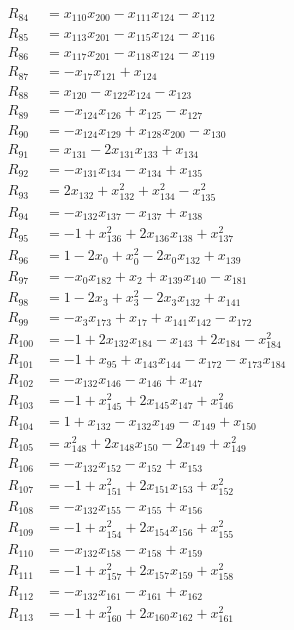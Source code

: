 \begin{align*}
R_{84}&=x_{110}x_{200}-x_{111}x_{124}-x_{112}\\
R_{85}&=x_{113}x_{201}-x_{115}x_{124}-x_{116}\\
R_{86}&=x_{117}x_{201}-x_{118}x_{124}-x_{119}\\
R_{87}&=-x_{17}x_{121}+x_{124}\\
R_{88}&=x_{120}-x_{122}x_{124}-x_{123}\\
R_{89}&=-x_{124}x_{126}+x_{125}-x_{127}\\
R_{90}&=-x_{124}x_{129}+x_{128}x_{200}-x_{130}\\
R_{91}&=x_{131}-2x_{131}x_{133}+x_{134}\\
R_{92}&=-x_{131}x_{134}-x_{134}+x_{135}\\
R_{93}&=2x_{132}+x_{132}^{2}+x_{134}^{2}-x_{135}^{2}\\
R_{94}&=-x_{132}x_{137}-x_{137}+x_{138}\\
R_{95}&=-1+x_{136}^{2}+2x_{136}x_{138}+x_{137}^{2}\\
R_{96}&=1-2x_{0}+x_{0}^{2}-2x_{0}x_{132}+x_{139}\\
R_{97}&=-x_{0}x_{182}+x_{2}+x_{139}x_{140}-x_{181}\\
R_{98}&=1-2x_{3}+x_{3}^{2}-2x_{3}x_{132}+x_{141}\\
R_{99}&=-x_{3}x_{173}+x_{17}+x_{141}x_{142}-x_{172}\\
R_{100}&=-1+2x_{132}x_{184}-x_{143}+2x_{184}-x_{184}^{2}\\
R_{101}&=-1+x_{95}+x_{143}x_{144}-x_{172}-x_{173}x_{184}\\
R_{102}&=-x_{132}x_{146}-x_{146}+x_{147}\\
R_{103}&=-1+x_{145}^{2}+2x_{145}x_{147}+x_{146}^{2}\\
R_{104}&=1+x_{132}-x_{132}x_{149}-x_{149}+x_{150}\\
R_{105}&=x_{148}^{2}+2x_{148}x_{150}-2x_{149}+x_{149}^{2}\\
R_{106}&=-x_{132}x_{152}-x_{152}+x_{153}\\
R_{107}&=-1+x_{151}^{2}+2x_{151}x_{153}+x_{152}^{2}\\
R_{108}&=-x_{132}x_{155}-x_{155}+x_{156}\\
R_{109}&=-1+x_{154}^{2}+2x_{154}x_{156}+x_{155}^{2}\\
R_{110}&=-x_{132}x_{158}-x_{158}+x_{159}\\
R_{111}&=-1+x_{157}^{2}+2x_{157}x_{159}+x_{158}^{2}\\
R_{112}&=-x_{132}x_{161}-x_{161}+x_{162}\\
R_{113}&=-1+x_{160}^{2}+2x_{160}x_{162}+x_{161}^{2}\\

\end{align*}
